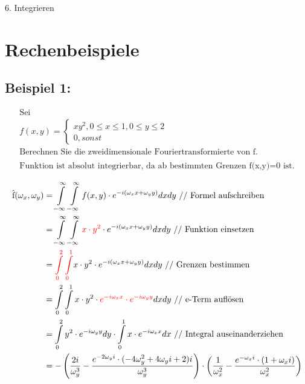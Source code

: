 \documentclass[11pt,final]{scrreprt}
\newcommand{\br} {\medskip\\}
\begin{document}
6. Integrieren\br

\newpage
\section{Rechenbeispiele}

\subsection*{Beispiel 1:}

\begin{align*}
&\text{Sei}&\\
&f(x,y) = \left\{
\begin{array}{l}
xy^2, 0\leq x\leq 1, 0\leq y\leq 2 \\ 
0, sonst
\end{array}
\right.\\
&\text{Berechnen Sie die zweidimensionale Fouriertransformierte von f.}\\\\
&\text{Funktion ist absolut integrierbar, da ab bestimmten Grenzen f(x,y)=0 ist.}
\end{align*}

\begin{align*}
\text{\^{f}}(\omega_x, \omega_y) &= \int\limits_{-\infty}^{\infty}\int\limits_{-\infty}^{\infty} f(x, y) \cdot e^{-i(\omega_x x + \omega_y y)} dx dy \text{  //  Formel aufschreiben} \\
&= \int\limits_{-\infty}^{\infty}\int\limits_{-\infty}^{\infty} \textcolor{red}{x \cdot y^2} \cdot e^{-i(\omega_x x + \omega_y y)} dx dy \text{  //  Funktion einsetzen} \\
&= \textcolor{red}{\int\limits_{0}^{2}\int\limits_{0}^{1}} x \cdot y^2 \cdot e^{-i(\omega_x x + \omega_y y)} dx dy \text{  //  Grenzen bestimmen} \\
&= \int\limits_{0}^{2}\int\limits_{0}^{1} x \cdot y^2 \cdot \textcolor{red}{e^{-i\omega_x x} \cdot e^{-i\omega_y y}} dx dy \text{  //  e-Term auflösen} \\
&= \int\limits_{0}^{2} y^2 \cdot e^{-i\omega_y y} dy \cdot \int\limits_{0}^{1} x \cdot e^{-i\omega_x x} dx  \text{  //  Integral auseinanderziehen} \\
&=- \left( \dfrac{2i}{\omega_y^3}- \dfrac {e^{-2\omega_y i} \cdot (-4\omega_y^2 + 4\omega_y i + 2)i} {\omega_y^3} \right) \cdot \left( \dfrac{1} {\omega_x^2} - \dfrac {e^{-\omega_x i}\cdot (1 + \omega_x i)} {\omega_x^2} \right)
\end{align*}
\bigskip
\end{document}
